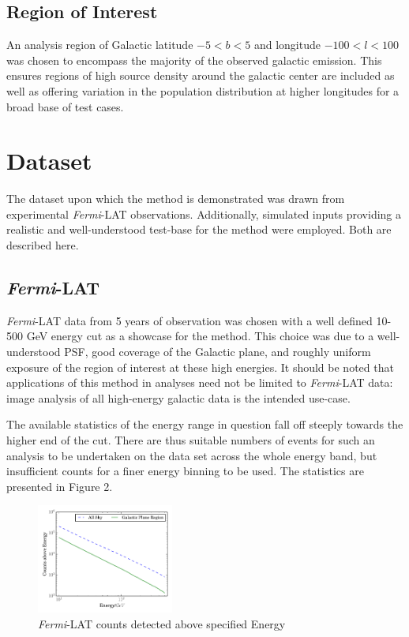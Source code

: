 \documentclass{PoS}
\begin{document}
\subsection{Region of Interest}

An analysis region of Galactic latitude $-5 < b < 5$ and longitude $-100 < l < 100$ was chosen to encompass the majority of the observed galactic emission. This ensures regions of high source density around the galactic center are included as well as offering variation in the population distribution at higher longitudes for a broad base of test cases.


\section{Dataset}

The dataset upon which the method is demonstrated was drawn from experimental \textit{Fermi}-LAT observations. Additionally, simulated inputs providing a realistic and well-understood test-base for the method were employed. Both are described here.

\subsection{\textit{Fermi}-LAT}

\textit{Fermi}-LAT data from 5 years of observation was chosen with a well defined 10-500 GeV energy cut as a showcase for the method. This choice was due to a well-understood PSF, good coverage of the Galactic plane, and roughly uniform exposure of the region of interest at these high energies. It should be noted that applications of this method in analyses need not be limited to \textit{Fermi}-LAT data: image analysis of all high-energy galactic data is the intended use-case.

The available statistics of the energy range in question fall off steeply towards the higher end of the cut. There are thus suitable numbers of events for such an analysis to be undertaken on the data set across the whole energy band, but insufficient counts for a finer energy binning to be used. The statistics are presented in Figure 2.

\begin{figure}
\vspace{-30pt}
  \begin{center}
      \includegraphics[width=0.4\textwidth]{figures/counts.pdf}
  \caption{\textit{Fermi}-LAT counts detected above specified Energy}
  \end{center}
  \vspace{-30pt}
\end{figure}
\end{document}
